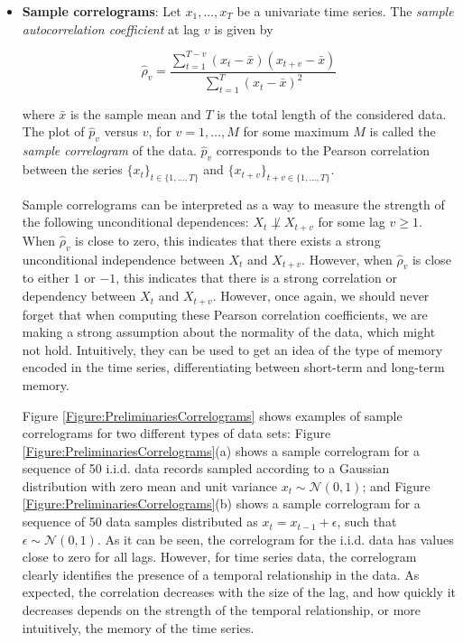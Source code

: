 \begin{itemize}
\item \textbf{Sample correlograms}: Let ${x_1,...,x_T}$ be a univariate time series. The \emph{sample autocorrelation coefficient} at lag $v$ is given by 

$$ \hat{\rho}_v =\frac{\sum_{t=1}^{T-v} (x_t-\bar{x})(x_{t+v}-\bar{x})}{\sum_{t=1}^{T} (x_t-\bar{x})^2}$$ 

\noindent where $\bar{x}$ is the sample mean and $T$ is the total length of the considered data. The plot of $\hat{p}_v$ versus $v$, for $v=1,\ldots, M$ for some maximum $M$ is called the \emph{sample correlogram} of the data. $\hat{p}_v$ corresponds to the Pearson correlation between the series $\{x_t\}_{t\in\{1,...,T\}}$ and $\{x_{t+v}\}_{t+v\in\{1,...,T\}}$.


Sample correlograms can be interpreted as a way to measure the strength of the following unconditional dependences: $X_t  \not\perp X_{t+v}$ for some lag $v \geq 1$.  When $\hat{\rho}_v$ is close to zero, this indicates that there exists a strong unconditional independence between $X_t$ and $X_{t+v}$. However, when $\hat{\rho}_v$ is close to either $1$ or $-1$, this indicates that there is a strong correlation or dependency between $X_t$ and $X_{t+v}$. However, once again, we should never forget that when computing these Pearson correlation coefficients, we are making a strong assumption about the normality of the data, which might not hold. Intuitively, they can be used to get an idea of the type of memory encoded in the time series, differentiating between short-term and long-term memory. 

Figure \ref{Figure:PreliminariesCorrelograms} shows examples of sample correlograms for two different types of data sets: Figure \ref{Figure:PreliminariesCorrelograms}(a) shows a sample correlogram for a sequence of 50 i.i.d. data records sampled according to a Gaussian distribution with zero mean and unit variance $x_t\sim {\mathcal N}(0,1)$; and Figure \ref{Figure:PreliminariesCorrelograms}(b) shows a sample correlogram for a sequence of 50 data samples distributed as $x_t=x_{t-1} + \epsilon$, such that $\epsilon\sim {\mathcal N}(0,1)$. As it can be seen, the correlogram for the i.i.d. data has values close to zero for all lags. However, for time series data, the correlogram clearly identifies the presence of a temporal relationship in the data. As expected, the correlation decreases with the size of the lag, and how quickly it decreases depends on the strength of the temporal relationship, or more intuitively, the memory of the time series. 



\end{itemize}
